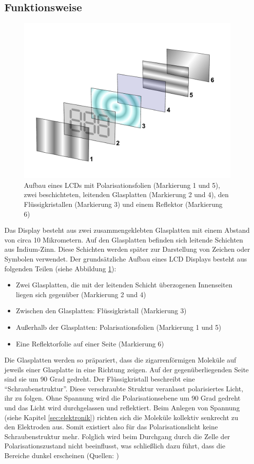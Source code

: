 \label{testmuster-seite1}
\subsection{Funktionsweise}

\begin{figure}[t]
  \centering
  \includegraphics[height=0.3\textwidth, keepaspectratio]{Bilder/LCD_layers}
  \caption{Aufbau eines LCDs mit Polarisationsfolien (Markierung 1 und 5), zwei beschichteten, leitenden Glasplatten (Markierung 2 und 4), den Flüssigkristallen (Markierung 3) und einem Reflektor (Markierung 6)
  \cite{lcdlayers}}
  \label{lcdaufbau}
\end{figure}

Das Display besteht aus zwei zusammengeklebten Glasplatten mit einem Abstand von circa 10 Mikrometern. Auf den Glasplatten befinden sich leitende Schichten aus Indium-Zinn. Diese Schichten werden später zur Darstellung von Zeichen oder Symbolen verwendet. Der grundsätzliche Aufbau eines LCD Displays besteht aus folgenden Teilen (siehe Abbildung \ref{lcdaufbau}):
\begin{itemize}
\item Zwei Glasplatten, die mit der leitenden Schicht überzogenen Innenseiten liegen sich gegenüber (Markierung 2 und 4)
\item Zwischen den Glasplatten: Flüssigkristall (Markierung 3)
\item Außerhalb der Glasplatten: Polarisationsfolien (Markierung 1 und 5)
\item Eine Reflektorfolie auf einer Seite (Markierung 6)
\end{itemize}
Die Glasplatten werden so präpariert, dass die zigarrenförmigen Moleküle auf jeweils einer Glasplatte in eine Richtung zeigen. Auf der gegenüberliegenden Seite sind sie um 90 Grad gedreht. Der Flüssigkristall beschreibt eine “Schraubenstruktur”.
Diese verschraubte Struktur veranlasst polarisiertes Licht, ihr zu folgen. Ohne Spannung wird die Polarisationsebene um 90 Grad gedreht und das Licht wird durchgelassen und reflektiert. Beim Anlegen von Spannung (siehe Kapitel \ref{sec:elektronik}) richten sich die Moleküle kollektiv senkrecht zu den Elektroden aus.
Somit existiert also für das Polarisationslicht keine Schraubenstruktur mehr.
Folglich wird beim Durchgang durch die Zelle der Polarisationszustand nicht beeinflusst, was schließlich dazu führt, dass die Bereiche dunkel erscheinen (Quellen: \cite{Bauanleitung} \cite{aufbau_und_funktion})


